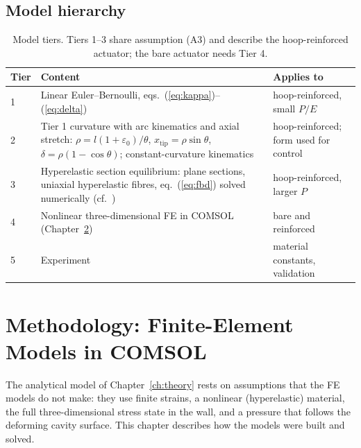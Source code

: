 \documentclass[12pt,a4paper,oneside]{report}
\numberwithin{equation}{chapter}
\numberwithin{figure}{chapter}
\numberwithin{table}{chapter}
\begin{document}
\section{Model hierarchy}
\begin{table}[H]
\centering\small
\caption[Model tiers]{Model tiers. Tiers 1--3 share assumption (A3) and describe the hoop-reinforced actuator; the bare
actuator needs Tier 4.}
\label{tab:tiers}
\begin{tabularx}{\textwidth}{@{}l>{\raggedright\arraybackslash}X>{\raggedright\arraybackslash}p{4.2cm}@{}}
\toprule
Tier & Content & Applies to\\
\midrule
1 & Linear Euler--Bernoulli, eqs.~(\ref{eq:kappa})--(\ref{eq:delta}) & hoop-reinforced, small $P/E$\\
2 & Tier 1 curvature with arc kinematics and axial stretch: $\rho=l(1+\varepsilon_0)/\theta$, $x_{\text{tip}}=\rho\sin\theta$, $\delta=\rho(1-\cos\theta)$; constant-curvature kinematics \cite{webster2010} & hoop-reinforced; form used for control\\
3 & Hyperelastic section equilibrium: plane sections, uniaxial hyperelastic fibres, eq.~(\ref{eq:fbd}) solved numerically (cf.\ \cite{polygerinos2015}) & hoop-reinforced, larger $P$\\
4 & Nonlinear three-dimensional FE in COMSOL (Chapter~\ref{ch:method}) & bare and reinforced\\
5 & Experiment & material constants, validation\\
\bottomrule
\end{tabularx}
\end{table}

\chapter{Methodology: Finite-Element Models in COMSOL}\label{ch:method}
The analytical model of Chapter~\ref{ch:theory} rests on assumptions that the FE models do not make: they
use finite strains, a nonlinear (hyperelastic) material, the full three-dimensional stress state in the
wall, and a pressure that follows the deforming cavity surface. This chapter describes how the models were
built and solved.
\end{document}
